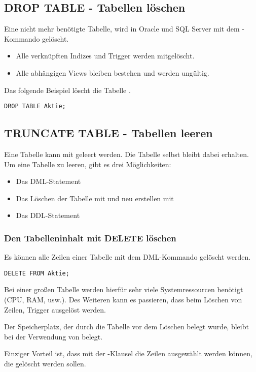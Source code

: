       \subsection{DROP TABLE - Tabellen l\"oschen}
        Eine nicht mehr ben\"otigte Tabelle, wird in Oracle und SQL Server mit dem -Kommando gel\"oscht.
        \begin{itemize}
          \item Alle verkn\"upften Indizes und Trigger werden mitgel\"oscht.
          \item Alle abh\"angigen Views bleiben bestehen und werden ung\"ultig.
        \end{itemize}
        Das folgende Beispiel l\"oscht die Tabelle .
        \begin{lstlisting}[language=oracle_sql,caption={Eine Tabelle l\"oschen},label=sql08_21]
DROP TABLE Aktie;
        \end{lstlisting}
      \subsection{TRUNCATE TABLE - Tabellen leeren}
        Eine Tabelle kann mit  geleert werden. Die Tabelle selbst bleibt dabei erhalten. Um eine Tabelle zu leeren, gibt es drei M\"oglichkeiten:
        \begin{itemize}
          \item Das DML-Statement 
          \item Das L\"oschen der Tabelle mit  und neu erstellen mit 
          \item Das DDL-Statement 
        \end{itemize}
        \subsubsection{Den Tabelleninhalt mit DELETE l\"oschen}
          Es k\"onnen alle Zeilen einer Tabelle mit dem DML-Kommando  gel\"oscht werden.
          \begin{lstlisting}[language=oracle_sql,caption={Zeilen mit DELETE l\"oschen},label=sql08_22]
DELETE FROM Aktie;
          \end{lstlisting}
          Bei einer gro\ss en Tabelle werden hierf\"ur sehr viele
          Systemressourcen ben\"otigt (CPU, RAM, usw.). Des Weiteren kann es
          passieren, dass beim L\"oschen von Zeilen, Trigger ausgel\"ost werden.
          \begin{merke}
            Der Speicherplatz, der durch die Tabelle vor dem L\"oschen belegt
            wurde, bleibt bei der Verwendung von  belegt.
          \end{merke}
          Einziger Vorteil ist, dass mit der -Klausel die
          Zeilen ausgew\"ahlt werden k\"onnen, die gel\"oscht werden sollen.
